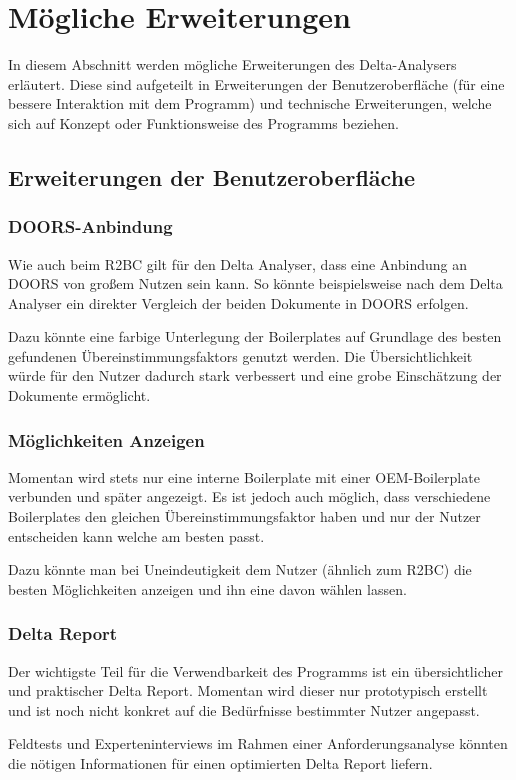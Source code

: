 \documentclass[12pt]{report}
\begin{document}
\section[Erweiterungen]{Mögliche Erweiterungen}
In diesem Abschnitt werden mögliche Erweiterungen des Delta-Analysers erläutert. Diese sind aufgeteilt in Erweiterungen der Benutzeroberfläche (für eine bessere Interaktion mit dem Programm) und technische Erweiterungen, welche sich auf Konzept oder Funktionsweise des Programms beziehen.
\subsection[Benutzeroberfläche]{Erweiterungen der Benutzeroberfläche}
\subsubsection{DOORS-Anbindung}
Wie auch beim R2BC gilt für den Delta Analyser, dass eine Anbindung an DOORS von großem Nutzen sein kann. So könnte beispielsweise nach dem Delta Analyser ein direkter Vergleich der beiden Dokumente in DOORS erfolgen.

Dazu könnte eine farbige Unterlegung der Boilerplates auf Grundlage des besten gefundenen Übereinstimmungsfaktors genutzt werden. Die Übersichtlichkeit würde für den Nutzer dadurch stark verbessert und eine grobe Einschätzung der Dokumente ermöglicht.
\subsubsection{Möglichkeiten Anzeigen}
Momentan wird stets nur eine interne Boilerplate mit einer OEM-Boilerplate verbunden und später angezeigt. Es ist jedoch auch möglich, dass verschiedene Boilerplates den gleichen Übereinstimmungsfaktor haben und nur der Nutzer entscheiden kann welche am besten passt.

Dazu könnte man bei Uneindeutigkeit dem Nutzer (ähnlich zum R2BC) die besten Möglichkeiten anzeigen und ihn eine davon wählen lassen.
\subsubsection{Delta Report}
Der wichtigste Teil für die Verwendbarkeit des Programms ist ein übersichtlicher und praktischer Delta Report. Momentan wird dieser nur prototypisch erstellt und ist noch nicht konkret auf die Bedürfnisse bestimmter Nutzer angepasst.

Feldtests und Experteninterviews im Rahmen einer Anforderungsanalyse könnten die nötigen Informationen für einen optimierten Delta Report liefern.
\end{document}
